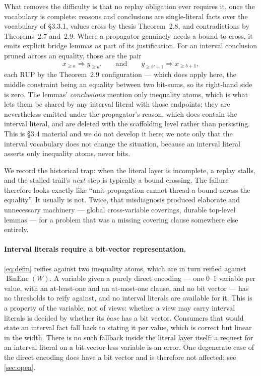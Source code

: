 \documentclass[11pt,a4paper]{article}
\theoremstyle{plain}
\theoremstyle{definition}
\theoremstyle{remark}
\newcommand{\fname}[1]{\ensuremath{\operatorname{#1}}}
\newcommand{\BinEnc}{\fname{BinEnc}}
\newcommand{\atge}[2]{#1_{\geq #2}}
\begin{document}
What removes the difficulty is that no replay obligation ever requires it, once
the vocabulary is complete: reasons and conclusions are single-literal facts
over the vocabulary of \S3.3.1, values cross by thesis
Theorem~2.8, and contradictions by Theorems~2.7 and~2.9.  Where a propagator
genuinely needs a bound to cross, it emits explicit bridge lemmas as part of its
justification.  For an interval conclusion pruned across an equality, those are
the pair
\[
  \atge{x}{a}\Rightarrow\atge{y}{a'}
  \qquad\text{and}\qquad
  \atge{y}{b'+1}\Rightarrow\atge{x}{b+1},
\]
each RUP by the Theorem~2.9 configuration --- which does apply here, the middle
constraint being an equality between two bit-sums, so its right-hand side is
zero.  The lemmas' \emph{conclusions} mention only inequality atoms, which is
what lets them be shared by any interval literal with those endpoints; they are
nevertheless emitted under the propagator's reason, which does contain the
interval literal, and are deleted with the scaffolding level rather than
persisting.  This is
\S3.4 material and we do not develop it here; we note only that the interval
vocabulary does not change the situation, because an interval literal asserts
only inequality atoms, never bits.

We record the historical trap: when the literal layer is incomplete, a replay
stalls, and the stalled trail's \emph{next} step is typically a bound crossing.
The failure therefore looks exactly like ``unit propagation cannot thread a
bound across the equality''.  It usually is not.  Twice, that misdiagnosis
produced elaborate and unnecessary machinery --- global cross-variable
coverings, durable top-level lemmas --- for a problem that was a missing
covering clause somewhere else entirely.

\paragraph{Interval literals require a bit-vector representation.}
\cref{eq:defin} reifies against two inequality atoms, which are in turn reified
against $\BinEnc(W)$.  A variable given a purely direct encoding --- one
$0$--$1$ variable per value, with an at-least-one and an at-most-one clause,
and no bit vector --- has no thresholds to reify against, and no interval literals are
available for it.  This is a property of the variable, not of views: whether a
view may carry interval literals is decided by whether its \emph{base} has a bit
vector.  Consumers that would state an interval fact fall back to stating it per
value, which is correct but linear in the width.  There is no such fallback
inside the literal layer itself: a request for an interval literal on a
bit-vector-less variable is an error.  One degenerate case of the direct
encoding does have a bit vector and is therefore not affected; see
\cref{sec:open}.
\end{document}
